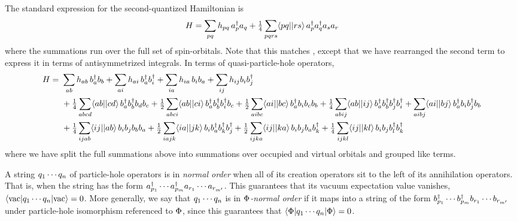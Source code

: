 \documentclass[11pt]{article}
\numberwithin{equation}{section}
\begin{document}
\begin{rmk}
The standard expression for the second-quantized Hamiltonian is
\begin{align}
  H
=
  \sum_{pq}
  h_{pq}\,
  a_p^\dagger a_q
+
  \tfrac{1}{4}
  \sum_{pqrs}
  \langle pq||rs\rangle\,
  a_p^\dagger a_q^\dagger a_sa_r
\end{align}
where the summations run over the full set of spin-orbitals.
Note that this matches , except that we have rearranged the second term to express it in terms of antisymmetrized integrals.
In terms of quasi-particle-hole operators,
\begin{align}
\nonumber
  H
=&\
  \sum_{ab}
  h_{ab}\,
  b_a^\dagger b_b
+
  \sum_{ai}
  h_{ai}\,
  b_a^\dagger b_i^\dagger
+
  \sum_{ia}
  h_{ia}\,
  b_i b_a
+
  \sum_{ij}
  h_{ij}
  b_i b_j^\dagger
\\\nonumber&\
+
  \tfrac{1}{4}
  \sum_{abcd}
  \langle ab||cd\rangle\,
  b_a^\dagger b_b^\dagger b_d b_c
+
  \tfrac{1}{2}
  \sum_{abci}
  \langle ab||ci\rangle\,
  b_a^\dagger b_b^\dagger b_i^\dagger b_c
+
  \tfrac{1}{2}
  \sum_{aibc}
  \langle ai||bc\rangle\,
  b_a^\dagger b_i b_c b_b
+
  \tfrac{1}{4}
  \sum_{abij}
  \langle ab||ij\rangle\,
  b_a^\dagger b_b^\dagger b_j^\dagger b_i^\dagger
+
  \sum_{aibj}
  \langle ai||bj\rangle\,
  b_a^\dagger b_i b_j^\dagger b_b
\\&\
+
  \tfrac{1}{4}
  \sum_{ijab}
  \langle ij||ab\rangle\,
  b_i b_j b_b b_a
+
  \tfrac{1}{2}
  \sum_{iajk}
  \langle ia||jk\rangle\,
  b_i b_a^\dagger b_k^\dagger b_j^\dagger
+
  \tfrac{1}{2}
  \sum_{ijka}
  \langle ij||ka\rangle\,
  b_i b_j b_a b_k^\dagger
+
  \tfrac{1}{4}
  \sum_{ijkl}
  \langle ij||kl\rangle\,
  b_i b_j b_l^\dagger b_k^\dagger
\end{align}
where we have split the full summations above into summations over occupied and virtual orbitals and grouped like terms.
\end{rmk}

\begin{dfn}
A string $q_1\cdots q_n$ of particle-hole operators is in \textit{normal order} when all of its creation operators sit to the left of its annihilation operators.
That is, when the string has the form $a_{p_1}^\dagger\cdots a_{p_m}^\dagger a_{r_1}\cdots a_{r_{m'}}$.
This guarantees that its vacuum expectation value vanishes, $\langle\mathrm{vac}|q_1\cdots q_n|\mathrm{vac}\rangle=0$.
More generally, we say that $q_1\cdots q_n$ is in \textit{$\Phi $-normal order} if it maps into a string of the form $b_{p_1}^\dagger\cdots b_{p_m}^\dagger b_{r_1}\cdots b_{r_{m'}}$ under particle-hole isomorphism referenced to $\Phi $, since this guarantees that
$\langle\Phi |q_1\cdots q_n|\Phi \rangle=0$.
\end{dfn}
\end{document}
